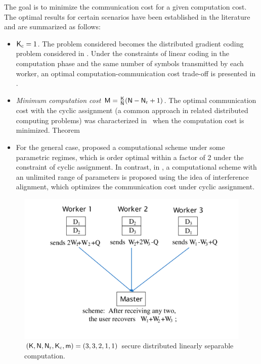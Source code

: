 \documentclass[conference,letterpaper]{IEEEtran}
\begin{document}
The goal is to minimize the communication cost for a given computation cost. The optimal results for certain scenarios have been established in the literature and are summarized as follows:
\begin{itemize}
\item  {\it ${\sf K}_{\rm c}=1$.} The problem considered becomes the distributed gradient coding problem considered in \cite{pmlr-v70-tandon17a,2021adaptive,ye2018communication}. Under the constraints of linear coding in the computation phase and the same number of symbols transmitted by each worker, an optimal computation-communication cost trade-off is presented in \cite{ye2018communication}.  
\item {\it Minimum computation cost ${\sf M} = \frac{{\sf K}}{{\sf N}}({\sf N} - {\sf N}_{\rm r} + 1)$.} The optimal communication cost with the cyclic assignment (a common approach in related distributed computing problems) was characterized in~\cite{m=1} when the computation cost is minimized. {\red Theorem}

  \item  For the general case, \cite{tradeoff} proposed a computational scheme under some parametric regimes, which is order optimal within a factor of 2 under the constraint of cyclic assignment. In contrast, in \cite{limit}, a computational scheme with an unlimited range of parameters is proposed using the idea of interference alignment, which optimizes the communication cost under cyclic assignment.
\end{itemize}  

\begin{figure}%
\centerline{\includegraphics[scale=0.2]{secure_computation}}
\caption{\small $({\sf K},{\sf N},{\sf N}_{\rm r},{\sf K}_{\rm c},{\sf m})=(3,3,2,1,1) $ secure distributed linearly separable  computation.}
\label{fig: system_model}
\end{figure}
\end{document}
